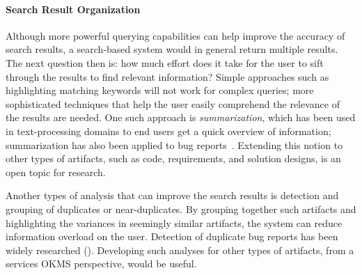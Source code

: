 \paragraph*{Search Result Organization}
Although more powerful querying capabilities can help improve the accuracy of
search results, a search-based system would in general return multiple
results. The next question then is: how much effort does it take for the user to
sift through the results to find relevant information? Simple approaches such as
highlighting matching keywords will not work for complex queries; more
sophisticated techniques that help the user easily comprehend the relevance of
the results are needed. One such approach is \textit{summarization}, which has
been used in text-processing domains to end users get a quick overview of
information; summarization has also been applied to bug
reports~\cite{Mani:2012,Rastkar:2010}. Extending this notion to other types of
artifacts, such as code, requirements, and solution designs, is an open topic
for research.

Another types of analysis that can improve the search results is detection and
grouping of duplicates or near-duplicates. By grouping together such artifacts
and highlighting the variances in seemingly similar artifacts, the system can
reduce information overload on the user.  Detection of duplicate bug reports has
been widely researched
(\eg \cite{wang2008approach,sun2010discriminative}). Developing such analyses
for other types of artifacts, from a services OKMS perspective, would be useful.


